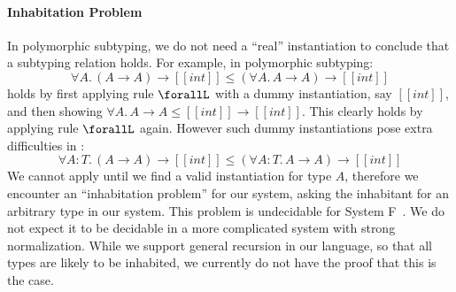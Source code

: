 \paragraph{Inhabitation Problem}

In polymorphic subtyping, we do not need a ``real'' instantiation to conclude
that a subtyping relation holds. For example, in polymorphic subtyping:
\begin{equation*}
    \forall A.\, (A \rightarrow A) \rightarrow [[int]] \le (\forall A.\, A \rightarrow A) \rightarrow [[int]]
\end{equation*}
\noindent holds by first applying rule $\forallL$ with a dummy instantiation,
say $[[int]]$, and then showing $\forall A.\, A \rightarrow A \le [[int]] \rightarrow [[int]]$.
This clearly holds by applying rule $\forallL$ again. However such dummy instantiations
pose extra difficulties in \name:
\begin{equation*}
    \forall A : T.\, (A \rightarrow A) \rightarrow [[int]] \le (\forall A : T.\, A \rightarrow A) \rightarrow [[int]]
\end{equation*}
We cannot apply  until we find a valid instantiation for type $A$,
therefore we encounter an ``inhabitation problem'' for our system, asking the
inhabitant for an arbitrary type in our system. This problem is
undecidable for System F~\cite{dudenhefner2019simpler}. We do not expect it to be
decidable in a more complicated system with strong normalization.
While we support general recursion in our language, so that all types are
likely to be inhabited, we currently do not have the proof that this is the case.
